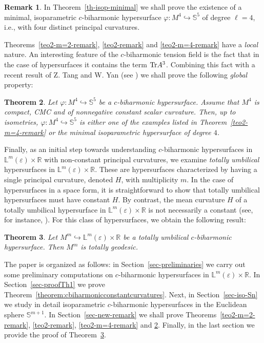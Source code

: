 \documentclass[11pt,leqno]{amsart}
\theoremstyle{plain}
\newtheorem{theorem}                {Theorem}      [section]
\theoremstyle{definition}
\newtheorem{remark}       [theorem]  {Remark}
\numberwithin{equation}{section}
\def \R{{\mathbb R}}
\def \s{{\mathbb S}}
\numberwithin{equation}{section}
\begin{document}
\begin{remark} In Theorem~\ref{th-isop-minimal} we shall prove the existence of a minimal, isoparametric $c$-biharmonic hypersurface $\varphi: M^4 \hookrightarrow \s^5$ of degree $\ell=4$, i.e., with four distinct principal curvatures. 
\end{remark}


Theorems~\ref{teo2-m=2-remark}, \ref{teo2-remark} and \ref{teo2-m=4-remark} have a \textit{local} nature. An interesting feature of the $c$-biharmonic tension field is the fact that in the case of hypersurfaces it contains the term ${\rm Tr}A^3$. Combining this fact with a recent result of Z. Tang and W. Yan (see \cite{MR4529031}) we shall prove the following \textit{global} property:
\begin{theorem}\label{teo-global}
Let $\varphi: M^4 \hookrightarrow \s^5$ be a $c$-biharmonic hypersurface. Assume that $M^4$ is compact, CMC and of nonnegative constant scalar curvature. Then, up to isometries, $\varphi: M^4 \hookrightarrow \s^5$ is either one of the examples listed in Theorem~\ref{teo2-m=4-remark} or the minimal isoparametric hypersurface of degree $4$. 
\end{theorem}


Finally, as an initial step towards understanding $c$-biharmonic hypersurfaces in \( {\mathbb L}^m(\varepsilon) \times \mathbb{R} \) with non-constant principal curvatures, we examine \textit{totally umbilical} hypersurfaces in \( {\mathbb L}^m(\varepsilon) \times \mathbb{R} \). These are hypersurfaces characterized by having a single principal curvature, denoted \( H \), with multiplicity \( m \). In the case of hypersurfaces in a space form, it is straightforward to show that totally umbilical hypersurfaces must have constant \( H \). By contrast,  the mean curvature $H$ of a totally umbilical hypersurface in \( {\mathbb L}^m(\varepsilon) \times \mathbb{R} \)  is not necessarily  a constant (see, for instance, \cite{MR4493653}).  
For this class of hypersurfaces, we obtain the following result:

\begin{theorem}\label{teo-rigidity-totally-geodesic}
Let $M^m\hookrightarrow {\mathbb L}^m(\varepsilon)\times \R$ be a totally umbilical $c$-biharmonic hypersurface. Then $M^m$ is totally geodesic. 
\end{theorem}


The paper is organized as follows: in Section~\ref{sec-preliminaries} we carry out some preliminary computations on $c$-biharmonic hypersurfaces in $\mathbb{ L}^m(\varepsilon)\times \R$. In Section~\ref{sec-proofTh1} we prove Theorem~\ref{theorem:cbiharmonicconstantcurvatures}. Next, in Section~\ref{sec-iso-Sn} we study in detail isoparametric $c$-biharmonic hypersurfaces in the Euclidean sphere $\s^{m+1}$. In Section~\ref{sec-new-remark} we shall prove Theorems~\ref{teo2-m=2-remark}, \ref{teo2-remark}, \ref{teo2-m=4-remark} and \ref{teo-global}. Finally, in the last section we provide the proof of Theorem~\ref{teo-rigidity-totally-geodesic}.\\
\end{document}
